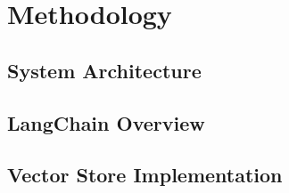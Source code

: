 \chapter{Methodology}

\section{System Architecture}

\section{LangChain Overview}

\section{Vector Store Implementation}
